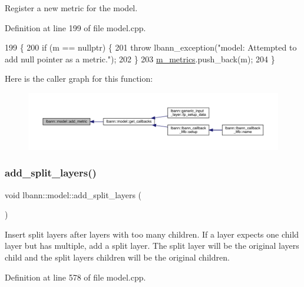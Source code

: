 Register a new metric for the model. 

Definition at line 199 of file model.\+cpp.


\begin{DoxyCode}
199                                 \{
200   \textcolor{keywordflow}{if} (m == \textcolor{keyword}{nullptr}) \{
201     \textcolor{keywordflow}{throw} lbann\_exception(\textcolor{stringliteral}{"model: Attempted to add null pointer as a metric."});
202   \}
203   \hyperlink{classlbann_1_1model_ae75c9aafe9e5a93980cc1bbae986bc79}{m\_metrics}.push\_back(m);
204 \}
\end{DoxyCode}
Here is the caller graph for this function\+:\nopagebreak
\begin{figure}[H]
\begin{center}
\leavevmode
\includegraphics[width=350pt]{classlbann_1_1model_a2ad536c9aeb5a1dfaa5a96107d62c4a4_icgraph}
\end{center}
\end{figure}
\mbox{\label{classlbann_1_1model_ac56d43e457cd4dfc3b88122bd10d286e}} 
\subsubsection{\texorpdfstring{add\+\_\+split\+\_\+layers()}{add\_split\_layers()}}
{\footnotesize\ttfamily void lbann\+::model\+::add\+\_\+split\+\_\+layers (\begin{DoxyParamCaption}{ }\end{DoxyParamCaption})\hspace{0.3cm}{\ttfamily [private]}}

Insert split layers after layers with too many children. If a layer expects one child layer but has multiple, add a split layer. The split layer will be the original layer\textquotesingle{}s child and the split layer\textquotesingle{}s children will be the original children. 

Definition at line 578 of file model.\+cpp.


